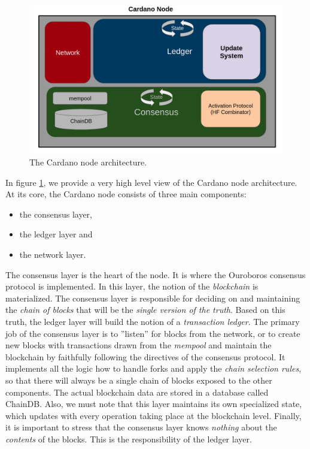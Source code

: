 \begin{figure}[h!] %
	\centering
	\includegraphics[width=0.8\columnwidth,
	keepaspectratio]{figures/cardano_node.png}
	\caption{The Cardano node architecture.}
	\label{fig:cardano_node}
\end{figure}

In figure \ref{fig:cardano_node}, we provide a very high level view of the
Cardano node architecture. At its core, the Cardano node consists of three main
components:
\begin{itemize}
	\item the consensus layer,
	\item the ledger layer and
	\item the network layer.
\end{itemize}
The consensus layer is the heart of the node. It is where the Ouroboros
consensus protocol \cite{C:KRDO17} is implemented. In this layer, the notion of
the \emph{blockchain} is materialized. The consensus layer is
responsible for deciding on and maintaining the \emph{chain of blocks} that
will be the \emph{single version of the truth}. Based on this truth, the ledger
layer
will build the notion of a \emph{transaction ledger}. The primary job of the
consensus layer is to ''listen'' for blocks from the network, or to create new
blocks with transactions drawn from the \emph{mempool} and maintain the
blockchain by faithfully following the directives of the consensus protocol. It
implements all the logic how to handle forks and apply the \emph{chain
	selection
	rules}, so
that there will always be a single chain of blocks exposed to the other
components. The actual blockchain data are stored in a database called ChainDB.
Also, we must note that this layer maintains its own specialized state, which
updates with every operation taking place at the blockchain level.
Finally, it is important to stress that the consensus layer knows
\emph{nothing} about the
\emph{contents} of the blocks. This is the responsibility of the ledger layer.

